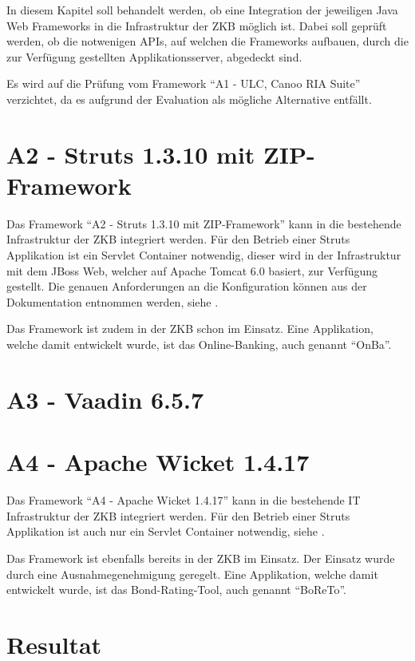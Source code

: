 In diesem Kapitel soll behandelt werden, ob eine Integration der jeweiligen Java
Web Frameworks in die Infrastruktur der \ac{ZKB} möglich ist. Dabei soll geprüft
werden, ob die notwenigen \acp{API}, auf welchen die Frameworks aufbauen, durch
die zur Verfügung gestellten Applikationsserver, abgedeckt sind.

Es wird auf die Prüfung vom Framework ``A1 - ULC, Canoo RIA Suite'' verzichtet,
da es aufgrund der Evaluation als mögliche Alternative entfällt.

\section{A2 - Struts 1.3.10 mit ZIP-Framework}

Das Framework ``A2 - Struts 1.3.10 mit ZIP-Framework'' kann in die bestehende
Infrastruktur der \ac{ZKB} integriert werden. Für den Betrieb einer Struts
Applikation ist ein Servlet Container notwendig, dieser wird in der
Infrastruktur mit dem JBoss Web, welcher auf Apache Tomcat 6.0 basiert, zur
Verfügung gestellt. Die genauen Anforderungen an die Konfiguration können aus
der Dokumentation entnommen werden, siehe \cite{StrutsDokumentation}.

Das Framework ist zudem in der \ac{ZKB} schon im Einsatz. Eine Applikation,
welche damit entwickelt wurde, ist das Online-Banking, auch genannt ``OnBa''.

\section{A3 - Vaadin 6.5.7}

\section{A4 - Apache Wicket 1.4.17}

Das Framework ``A4 - Apache Wicket 1.4.17'' kann in die bestehende IT
Infrastruktur der \ac{ZKB} integriert werden. Für den Betrieb einer Struts
Applikation ist auch nur ein Servlet Container notwendig, siehe
\cite{WicketDokumentation}.

Das Framework ist ebenfalls bereits in der \ac{ZKB} im Einsatz. Der Einsatz
wurde durch eine Ausnahmegenehmigung geregelt. Eine Applikation, welche damit
entwickelt wurde, ist das Bond-Rating-Tool, auch genannt ``BoReTo''.

\section{Resultat}